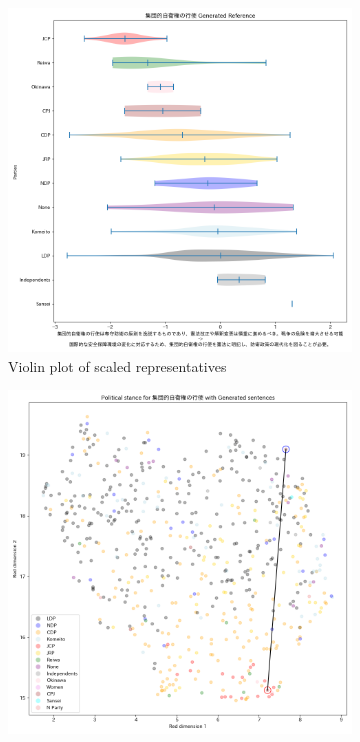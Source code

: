 \documentclass[final,5p,times,twocolumn,authoryear]{elsarticle}
\begin{document}
\begin{figure}[h]
\centering
    \begin{subfigure}{0.22\textwidth}
      \centering
      \includegraphics[width=1\linewidth]{figs/results/defence/集団的自衛権の行使_gen_violin_plot.png}
      \caption{Violin plot of scaled representatives}
    \end{subfigure}
    \begin{subfigure}{0.22\textwidth}
      \centering
      \includegraphics[width=1\linewidth]{figs/results/defence/集団的自衛権の行使_umap_gen.png}

\end{subfigure}
\end{figure}
\end{document}
